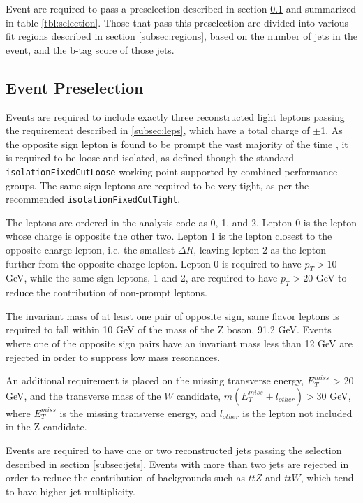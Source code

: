 
Event are required to pass a preselection described in section \ref{subsec:presel} and summarized in table \ref{tbl:selection}. Those that pass this preselection are divided into various fit regions described in section \ref{subsec:regions}, based on the number of jets in the event, and the b-tag score of those jets.

\subsection{Event Preselection}
\label{subsec:presel}

Events are required to include exactly three reconstructed light leptons passing the requirement described in \ref{subsec:leps}, which have a total charge of $\pm$1. As the opposite sign lepton is found to be prompt the vast majority of the time \cite{ttH_paper}, it is required to be loose and isolated, as defined though the standard \verb|isolationFixedCutLoose| working point supported by combined performance groups. The same sign leptons are required to be very tight, as per the recommended \verb|isolationFixedCutTight|.

The leptons are ordered in the analysis code as 0, 1, and 2. Lepton 0 is the lepton whose charge is opposite the other two. Lepton 1 is the lepton closest to the opposite charge lepton, i.e. the smallest $\Delta R$, leaving lepton 2 as the lepton further from the opposite charge lepton. Lepton 0 is required to have $p_T > 10$ GeV, while the same sign leptons, 1 and 2, are required to have $p_T > 20$ GeV to reduce the contribution of non-prompt leptons.  

The invariant mass of at least one pair of opposite sign, same flavor leptons is required to fall within 10 GeV of the mass of the Z boson, 91.2 GeV. Events where one of the opposite sign pairs have an invariant mass less than 12 GeV are rejected in order to suppress low mass resonances. %

An additional requirement is placed on the missing transverse energy, $E^{miss}_T$ > 20 GeV, and the transverse mass of the $W$ candidate, $m(E^{miss}_T + l_{other}) > 30$ GeV, where $E^{miss}_T$ is the missing transverse energy, and $l_{other}$ is the lepton not included in the Z-candidate. 

Events are required to have one or two reconstructed jets passing the selection described in section \ref{subsec:jets}. Events with more than two jets are rejected in order to reduce the contribution of backgrounds such as $t\bar{t}Z$ and $t\bar{t}W$, which tend to have higher jet multiplicity. 

